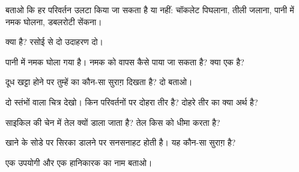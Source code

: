 \begin{exercise}[$\star$]\label{exo:g5:irreversible-changes:1}
बताओ कि हर परिवर्तन उलटा किया जा सकता है या नहीं: चॉकलेट पिघलाना, तीली
जलाना, पानी में नमक घोलना, डबलरोटी सेंकना।
\end{exercise}

\begin{exercise}[$\star$]\label{exo:g5:irreversible-changes:2}
 क्या है? रसोई से दो उदाहरण दो।
\end{exercise}

\begin{exercise}[$\star$]\label{exo:g5:irreversible-changes:3}
पानी में नमक घोला गया है। नमक को वापस कैसे पाया जा सकता है? क्या 
एक  है?
\end{exercise}

\begin{exercise}[$\star$]\label{exo:g5:irreversible-changes:4}
दूध खट्टा होने पर तुम्हें  का कौन-सा सुराग़ दिखता है?
दो बताओ।
\end{exercise}

\begin{exercise}[$\star$]\label{exo:g5:irreversible-changes:5}
दो स्तंभों वाला चित्र देखो। किन परिवर्तनों पर दोहरा तीर है? दोहरे तीर
का क्या अर्थ है?
\end{exercise}

\begin{exercise}[$\star$]\label{exo:g5:irreversible-changes:6}
साइकिल की चेन में तेल क्यों डाला जाता है? तेल किस  को
धीमा करता है?
\end{exercise}

\begin{exercise}[$\star$]\label{exo:g5:irreversible-changes:7}
खाने के सोडे पर सिरका डालने पर सनसनाहट होती है। यह कौन-सा सुराग़ है?
\end{exercise}

\begin{exercise}[$\star$]\label{exo:g5:irreversible-changes:8}
एक उपयोगी  और एक हानिकारक  का नाम बताओ।
\end{exercise}

